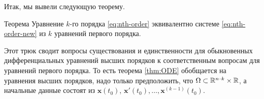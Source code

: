 {Итак, мы вывели следующую теорему.

\begin{thm}{Теорема}\label{thm:ODE-nth-order}
Уравнение $k$-го порядка \ref{eq:nth-order} эквивалентно системе \ref{eq:nth-order-new} из $k$ уравнений первого порядка.
\end{thm}

Этот трюк сводит вопросы существования и единственности для обыкновенных дифференциальных уравнений высших порядков к соответственным вопросам для уравнений первого порядка.
То есть теорема \ref{thm:ODE} обобщается на уравнения высших порядков, надо только предположить, что $\Omega\z\subset \mathbb{R}^{n\cdot k}\times \mathbb{R}$, а начальные данные состоят из $\bm{x}(t_0)$, $\bm{x}'(t_0),\dots,\bm{x}^{(k-1)}(t_0)$.


\spell{\end{multicols}}{}
}
